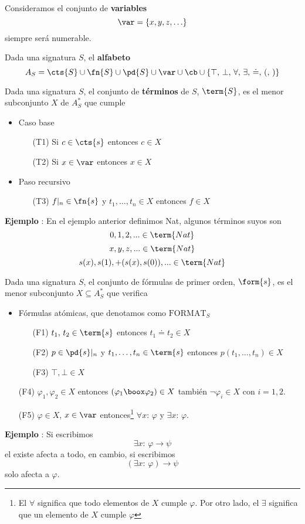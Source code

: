 \paragraph{}
Consideramos el conjunto de \textbf{variables}
\[ \var = \{x,y,z, \ldots \} \]
siempre será numerable. 
\begin{definition}
Dada una signatura $S$, el \textbf{alfabeto} 
\[ A_S =\cts{S} \cup \fn{S} \cup \pd{S} \cup \var \cup \cb \cup \{ \top,\, \bot,\, \forall,\, \exists,\, \doteq, \, (, \, )\} \]
\end{definition}
\begin{definition}
Dada una signatura $S$, el conjunto de \textbf{términos} de $S$, $\term{S}$, es el menor subconjunto $X$ de $A^*_S$ que cumple 
\begin{itemize}
	\item Caso base 
	\begin{itemize}
		\item[(T1)] Si $c \in \cts{s}$ entonces $c \in X$
		\item[(T2)] Si $x \in \var$ entonces $x \in X$
	\end{itemize}
	\item Paso recursivo
	\begin{itemize}
		\item[(T3)] $f\vert_{n} \in \fn{s}$ y $t_1, \ldots, t_n \in X$ entonces $f \in X$
	\end{itemize}
\end{itemize}
\end{definition}
\addtocounter{ej}{1} %
\textbf{Ejemplo }: En el ejemplo anterior definimos Nat, algunos términos suyos son 
\[ 0, 1, 2,... \in \term{Nat} \] 
\[ x, y, z,... \in \term{Nat} \]
\[ s(x), s(1), +(s(x),s(0)),... \in \term{Nat} \]
\begin{definition}
Dada una signatura $S$, el conjunto de fórmulas de primer orden, $\form{s}$, es el menor subconjunto $X \subseteq A^*_S$ que verifica
\begin{itemize}
	\item Fórmulas atómicas, que denotamos como $\mbox{FORMAT}_{S}$
	\begin{itemize}
		\item[(F1)] $t_1, \, t_2 \in \term{s}$ entonces $t_1 \doteq t_2 \in X$
		\item[(F2)] $p \in \pd{s}\vert_{n}$ y $t_1, \ldots, t_n \in \term{s}$ entonces $p(t_1, \ldots, t_n) \in X$
		\item[(F3)]$\top, \bot \in X$
	\end{itemize}
	\item[(F4)] $\varphi_1, \varphi_2 \in X$ entonces $(\varphi_1 \boox \varphi_2) \in X$ también $\neg \varphi_i \in X$ con $i=1,2$.
	\item[(F5)] $\varphi \in X$, $x \in \var$ entonces\footnote{El $\forall$ significa que todo elementos de $X$ cumple $\varphi$. Por otro lado, el $\exists$ significa que un elemento de $X$ cumple $\varphi$} $\forall x: \, \varphi$ y $\exists x: \, \varphi$.
\end{itemize}
\end{definition}
\addtocounter{ej}{1} %
\textbf{Ejemplo }: Si escribimos 
\[  \exists x: \, \varphi \rightarrow \psi  \]
el existe afecta a todo, en cambio, si escribimos 
\[  (\exists x: \, \varphi) \rightarrow \psi  \]
solo afecta a $\varphi$.
